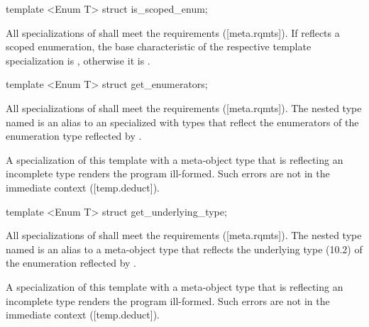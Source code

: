 \begin{std.txt}\color{addclr}

\begin{itemdecl}
template <Enum T> struct is_scoped_enum;
\end{itemdecl}

\begin{itemdescr}
\pnum
All specializations of  shall meet the  requirements ([meta.rqmts]). If  reflects a scoped enumeration, the base characteristic of the respective template specialization is , otherwise it is .

\end{itemdescr}

\begin{itemdecl}
template <Enum T> struct get_enumerators;
\end{itemdecl}

\begin{itemdescr}
\pnum
All specializations of  shall meet the  requirements ([meta.rqmts]). The nested type named  is an alias to an  specialized with  types that reflect the enumerators of the enumeration type reflected by .

\pnum
\remarks
A specialization of this template with a meta-object type that is reflecting an incomplete type renders the program ill-formed.
      Such errors are not in the immediate context ([temp.deduct]).
\end{itemdescr}

\begin{itemdecl}
template <Enum T> struct get_underlying_type;
\end{itemdecl}

\begin{itemdescr}
\pnum
All specializations of  shall meet the  requirements ([meta.rqmts]). The nested type named  is an alias to a meta-object type that reflects the underlying type (10.2) of the enumeration reflected by .

\pnum
\remarks
A specialization of this template with a meta-object type that is reflecting an incomplete type renders the program ill-formed.
      Such errors are not in the immediate context ([temp.deduct]).
\end{itemdescr}
\end{std.txt}

